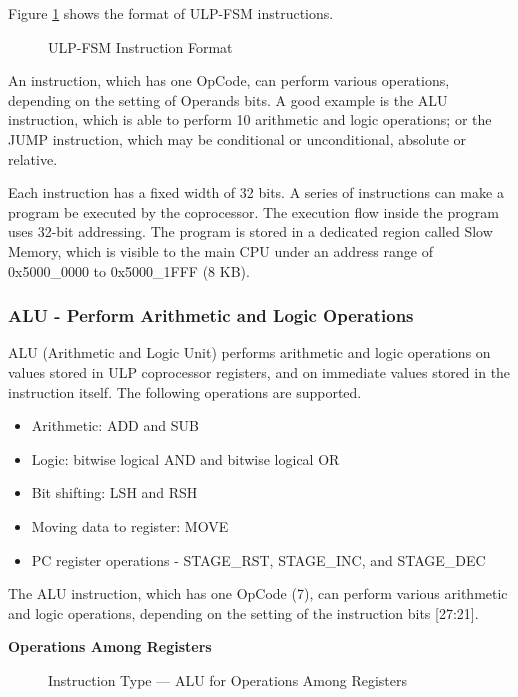 \documentclass[main\_\_EN.tex]{subfiles}
\begin{document}
Figure \ref{figure:ULP-instruction} shows the format of ULP-FSM instructions.

%
%
\begin{figure}[!ht ]
    \centering
    \caption{ULP-FSM Instruction Format}
    \label{figure:ULP-instruction}
\end{figure}

An instruction, which has one OpCode, can perform various operations, depending on the setting of Operands bits. A good example is the ALU instruction, which is able to perform 10 arithmetic and logic operations; or the JUMP instruction, which may be conditional or unconditional, absolute or relative.

Each instruction has a fixed width of 32 bits. A series of instructions can make a program be executed by the coprocessor. The execution flow inside the program uses 32-bit addressing. The program is stored in a dedicated region called Slow Memory, which is visible to the main CPU under an address range of 0x{}5000\_0000 to 0x{}5000\_1FFF (8 KB).

\subsubsection{ALU - Perform Arithmetic and Logic Operations}

ALU (Arithmetic and Logic Unit) performs arithmetic and logic operations on values stored in ULP coprocessor registers, and on immediate values stored in the instruction itself. The following operations are supported.
\begin{itemize}
    \item Arithmetic: ADD and SUB
    \item Logic: bitwise logical AND and bitwise logical OR
    \item Bit shifting: LSH and RSH
    \item Moving data to register: MOVE
    \item PC register operations - STAGE\_RST, STAGE\_INC, and STAGE\_DEC
\end{itemize}

The ALU instruction, which has one OpCode (7), can perform various arithmetic and logic operations, depending on the setting of the instruction bits [27:21].

\textcolor{istcolor}{\textbf{Operations Among Registers}}

%
%
%
%
%
%
%
%
\begin{figure}[!ht ]
    \centering
    \caption{Instruction Type — ALU for Operations Among Registers}
    \label{figure:ALU-among-registers}
\end{figure}
\end{document}
